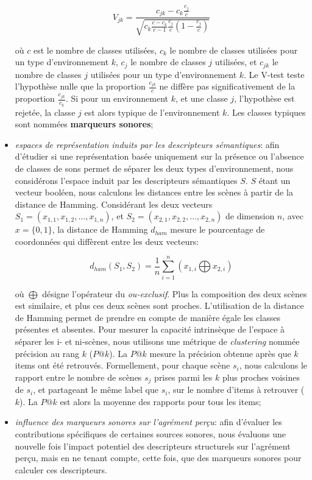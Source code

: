 \documentclass[twoside,twocolumn]{article}
\begin{document}
\begin{itemize}
\begin{equation*}
V_{jk}=\dfrac{c_{jk}-c_k\frac{c_j}{c}}{\sqrt{c_k\frac{c-c_k}{c-1}\frac{c_j}{c}(1-\frac{c_j}{c})}}
\end{equation*}

où $c$ est le nombre de classes utilisées, $c_k$ le nombre de classes utilisées pour un type d'environnement $k$, $c_j$ le nombre de classes $j$ utilisées, et $c_{jk}$ le nombre de classes $j$ utilisées pour un type d'environnement $k$. Le V-test teste l'hypothèse nulle que la proportion $\frac{c_{jk}}{c}$ ne diffère pas significativement de la proportion $\frac{c_{jk}}{c_k}$. Si pour un environnement $k$, et une classe $j$, l'hypothèse est rejetée, la classe $j$ est alors typique de l'environnement $k$. Les classes typiques sont nommées \textbf{marqueurs sonores};

\item \emph{espaces de représentation induits par les descripteurs sémantiques}: afin d'étudier si une représentation basée uniquement sur la présence ou l'absence de classes de sons permet de séparer les deux types d'environnement, nous considérons l'espace induit par les descripteurs sémantiques $S$. $S$ étant un vecteur booléen, nous calculons les distances entre les scènes à partir de la distance de Hamming. Considérant les deux vecteurs $S_1=(x_{1,1},x_{1,2},\ldots,x_{1,n})$, et $S_2=(x_{2,1},x_{2,2},\ldots,x_{2,n})$ de dimension $n$, avec $x=\lbrace 0,1\rbrace$, la distance de Hamming $d_{ham}$ mesure le pourcentage de coordonnées qui diffèrent entre les deux vecteurs:   

\begin{equation*}
d_{ham}(S_1,S_2)=\dfrac{1}{n}\sum_{i=1}^{n} (x_{1,i} \bigoplus x_{2,i})
\end{equation*}

où $\bigoplus$ désigne l'opérateur du \emph{ou-exclusif}. Plus la composition des deux scènes est similaire, et plus ces deux scènes sont proches. L'utilisation de la distance de Hamming permet de prendre en compte de manière égale les classes présentes et absentes. Pour mesurer la capacité intrinsèque de l'espace à séparer les i- et ni-scènes, nous utilisons une métrique de \emph{clustering} nommée précision au rang $k$ ($P@k$). La $P@k$ mesure la précision obtenue après que $k$ items ont été retrouvés. Formellement, pour chaque scène $s_i$, nous calculons le rapport entre le nombre de scènes $s_j$ prises parmi les $k$ plus proches voisines de $s_i$, et partageant le même label que $s_i$, sur le nombre d'items à retrouver ($k$). La $P@k$ est alors la moyenne des rapports pour tous les items;

\item \emph{influence des marqueurs sonores sur l'agrément perçu}: afin d'évaluer les contributions spécifiques de certaines sources sonores, nous évaluons une nouvelle fois l'impact potentiel des descripteurs structurels sur l'agrément perçu, mais en ne tenant compte, cette fois, que des marqueurs sonores pour calculer ces descripteurs.
\end{itemize}
\end{document}
